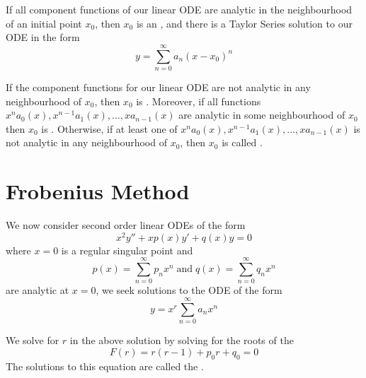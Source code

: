 \documentclass[12pt, a4paper, oneside, openright, titlepage]{book}
\begin{document}


\begin{defn}
        If all component functions of our linear ODE are analytic in the neighbourhood of an initial point $x_0$, then $x_0$ is an , and there is a Taylor Series solution to our ODE in the form \begin{equation}
                y = \sum\limits_{n=0}^{\infty}a_n(x-x_0)^n
        \end{equation}
\end{defn}




\begin{defn}
        If the component functions for our linear ODE are not analytic in any neighbourhood of $x_0$, then $x_0$ is . Moreover, if all functions $x^na_0(x), x^{n-1}a_1(x),...,xa_{n-1}(x)$ are analytic in some neighbourhood of $x_0$ then $x_0$ is . Otherwise, if at least one of $x^na_0(x), x^{n-1}a_1(x),...,xa_{n-1}(x)$ is not analytic in any neighbourhood of $x_0$, then $x_0$ is called .
\end{defn}






\section{Frobenius Method}

\begin{defn}
        We now consider second order linear ODEs of the form \begin{equation}
                x^2y''+xp(x)y'+q(x)y = 0
        \end{equation}
        where $x=0$ is a regular singular point and \begin{equation}
                p(x) = \sum\limits_{n=0}^{\infty}p_nx^n\;\text{and}\;q(x) = \sum\limits_{n=0}^{\infty}q_nx^n
        \end{equation}
        are analytic at $x = 0$, we seek solutions to the ODE of the form \begin{equation}
                y = x^r\sum\limits_{n=0}^{\infty}a_nx^n
        \end{equation}
\end{defn}



\begin{defn}
        We solve for $r$ in the above solution by solving for the roots of the  \begin{equation}
                F(r) = r(r-1)+p_0r+q_0 = 0
        \end{equation}
        The solutions to this equation are called the .
\end{defn}
\end{document}
